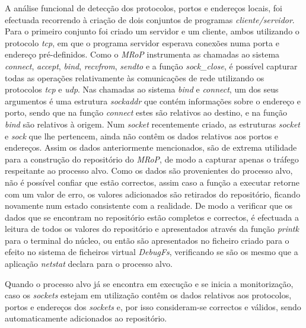 A análise funcional de detecção dos protocolos, portos e endereços locais, foi efectuada recorrendo à criação de dois conjuntos de programas \textit{cliente/servidor}.
Para o primeiro conjunto foi criado um servidor e um cliente, ambos utilizando o protocolo \textit{tcp}, em que o programa servidor esperava conexões numa porta e endereço pré-definidos.
Como o \textit{MRoP} instrumenta as chamadas ao sistema \textit{connect}, \textit{accept}, \textit{bind}, \textit{recvfrom}, \textit{sendto} e a função \textit{sock\_close}, é possível capturar todas as operações relativamente às comunicações de rede utilizando os protocolos \textit{tcp} e \textit{udp}.
Nas chamadas ao sistema \textit{bind} e \textit{connect}, um dos seus argumentos é uma estrutura \textit{sockaddr} que contém informações sobre o endereço e porto, sendo que na função \textit{connect} estes são relativos ao destino, e na função \textit{bind} são relativos à origem.
Num \textit{socket} recentemente criado, as estruturas \textit{socket} e \textit{sock} que lhe pertencem, ainda não contêm os dados relativos aos portos e endereços.
Assim os dados anteriormente mencionados, são de extrema utilidade para a construção do repositório do \textit{MRoP}, de modo a capturar apenas o tráfego respeitante ao processo alvo.
Como os dados são provenientes do processo alvo, não é possível confiar que estão correctos, assim caso a função a executar retorne com um valor de erro, os valores adicionados são retirados do repositório, ficando novamente num estado consistente com a realidade.
De modo a verificar que os dados que se encontram no repositório estão completos e correctos, é efectuada a leitura de todos os valores do repositório e apresentados através da função \textit{printk} para o terminal do núcleo, ou então são apresentados no ficheiro criado para o efeito no sistema de ficheiros virtual \textit{DebugFs}, verificando se são os mesmo que a aplicação \textit{netstat} declara para o processo alvo.

Quando o processo alvo já se encontra em execução e se inicia a monitorização, caso os \textit{sockets} estejam em utilização contêm os dados relativos aos protocolos, portos e endereços dos \textit{sockets} e, por isso consideram-se correctos e válidos, sendo automaticamente adicionados ao repositório.



